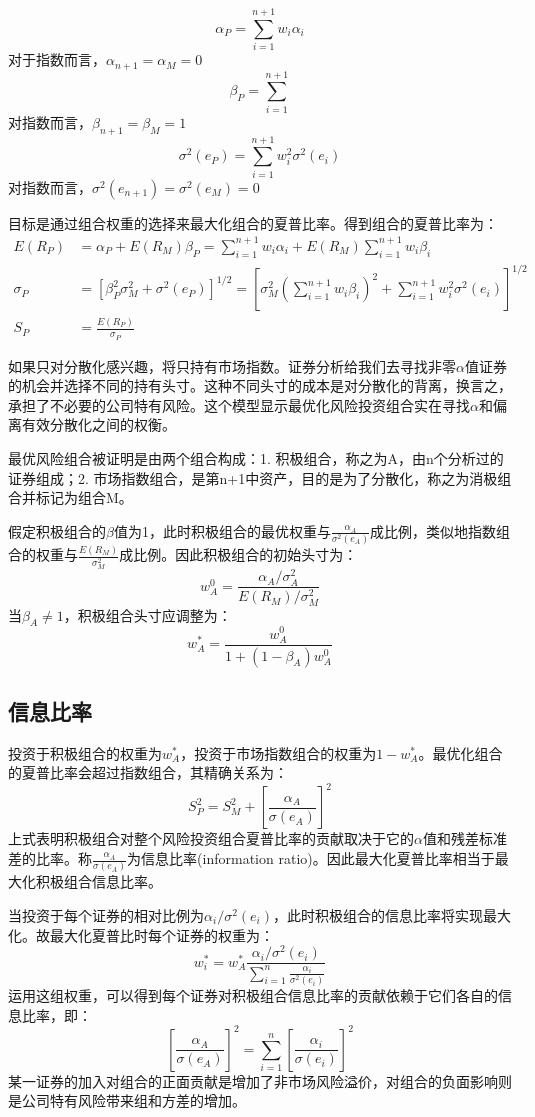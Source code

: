 \documentclass{article}
\begin{document}
\[
\alpha_P=\sum_{i=1}^{n+1}w_i\alpha_i
\]
对于指数而言，$ \alpha_{n+1}=\alpha_M=0 $
\[
\beta_P=\sum_{i=1}^{n+1}
\]
对指数而言，$ \beta_{n+1}=\beta_M=1 $
\[
\sigma^2(e_P)=\sum_{i=1}^{n+1}w_i^2\sigma^2(e_i)
\]
对指数而言，$ \sigma^2(e_{n+1})=\sigma^2(e_M)=0 $

\hspace*{\fill}

目标是通过组合权重的选择来最大化组合的夏普比率。得到组合的夏普比率为：
\begin{equation*}
	\begin{split}
	E(R_P)&=\alpha_P+E(R_M)\beta_P=\sum_{i=1}^{n+1}w_i\alpha_i+E(R_M)\sum_{i=1}^{n+1}w_i\beta_i\\
	\sigma_P&=[\beta_P^2\sigma_M^2+\sigma^2(e_P)]^{1/2}=[\sigma_M^2(\sum_{i=1}^{n+1}w_i\beta_i)^2+\sum_{i=1}^{n+1}w_i^2\sigma^2(e_i)]^{1/2}\\
	S_P&=\frac{E(R_P)}{\sigma_P}
	\end{split}
\end{equation*}

如果只对分散化感兴趣，将只持有市场指数。证券分析给我们去寻找非零$ \alpha $值证券的机会并选择不同的持有头寸。这种不同头寸的成本是对分散化的背离，换言之，承担了不必要的公司特有风险。这个模型显示最优化风险投资组合实在寻找$ \alpha $和偏离有效分散化之间的权衡。

最优风险组合被证明是由两个组合构成：1. 积极组合，称之为A，由n个分析过的证券组成；2. 市场指数组合，是第n+1中资产，目的是为了分散化，称之为消极组合并标记为组合M。

假定积极组合的$ \beta $值为1，此时积极组合的最优权重与$ \frac{\alpha_A}{\sigma^2(e_A)} $成比例，类似地指数组合的权重与$ \frac{E(R_M)}{\sigma_M^2} $成比例。因此积极组合的初始头寸为：
\[
w^0_A=\frac{\alpha_A/\sigma^2_A}{E(R_M)/\sigma_M^2}
\]
当$ \beta_A\ne 1 $，积极组合头寸应调整为：
\[
w^*_A=\frac{w^0_A}{1+(1-\beta_A)w^0_A}
\]

\subsection{信息比率}
投资于积极组合的权重为$ w_A^* $，投资于市场指数组合的权重为$ 1-w_A^* $。最优化组合的夏普比率会超过指数组合，其精确关系为：
\[
S_P^2=S_M^2+[\frac{\alpha_A}{\sigma(e_A)}]^2
\]
上式表明积极组合对整个风险投资组合夏普比率的贡献取决于它的$ \alpha $值和残差标准差的比率。称$ \frac{\alpha_A}{\sigma(e_A)} $为信息比率(information ratio)。因此最大化夏普比率相当于最大化积极组合信息比率。

当投资于每个证券的相对比例为$ \alpha_i/\sigma^2(e_i) $，此时积极组合的信息比率将实现最大化。故最大化夏普比时每个证券的权重为：
\[
w_i^*=w_A^*\frac{\alpha_i/\sigma^2(e_i)}{\sum_{i=1}^{n}\frac{\alpha_i}{\sigma^2(e_i)}}
\]
运用这组权重，可以得到每个证券对积极组合信息比率的贡献依赖于它们各自的信息比率，即：
\[
[\frac{\alpha_A}{\sigma(e_A)}]^2=\sum_{i=1}^{n}[\frac{\alpha_i}{\sigma(e_i)}]^2
\]
某一证券的加入对组合的正面贡献是增加了非市场风险溢价，对组合的负面影响则是公司特有风险带来组和方差的增加。
\end{document}
